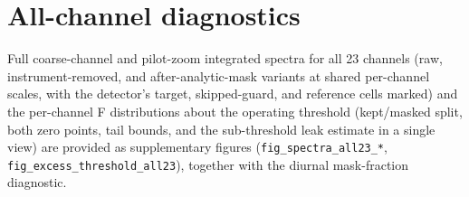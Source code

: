 \FloatBarrier  %

\section{All-channel diagnostics}
\label{app:diagnostics}
Full coarse-channel and pilot-zoom integrated spectra for all 23
channels (raw, instrument-removed, and after-analytic-mask variants at
shared
per-channel scales, with the detector's target, skipped-guard, and
reference cells marked) and the per-channel F distributions about the
operating threshold (kept/masked split, both zero points, tail bounds,
and the sub-threshold leak estimate in a single view) are provided as
supplementary figures (\texttt{fig\_spectra\_all23\_*},
\texttt{fig\_excess\_threshold\_all23}), together with the diurnal
mask-fraction diagnostic. 

